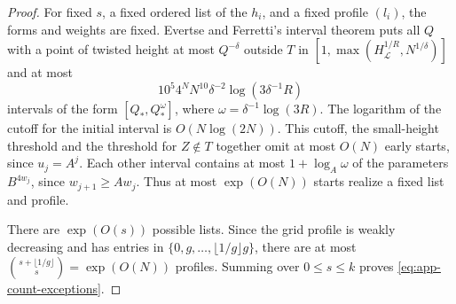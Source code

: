 \documentclass[11pt,reqno,a4paper]{amsart}
\theoremstyle{remark}
\begin{document}
\begin{proof}
For fixed \(s\), a fixed ordered list of the \(h_i\), and a fixed
profile \((l_i)\), the forms and weights are fixed.
Evertse and Ferretti's interval theorem
\cite[Theorem~2.3]{cnt-evertse-ferretti} puts all \(Q\) with a
point of twisted height at most \(Q^{-\delta}\) outside \(T\) in
\([1,\max(H_{\mathcal L}^{1/R},N^{1/\delta})]\) and at most
\[
 10^5 4^N N^{10}\delta^{-2}\log(3\delta^{-1}R)
\]
intervals of the form \([Q_*,Q_*^\omega]\), where
\(\omega=\delta^{-1}\log(3R)\). The logarithm of the cutoff for
the initial interval is \(O(N\log(2N))\). This cutoff, the
small-height threshold and the threshold for \(Z\notin T\) together
omit at most \(O(N)\) early starts, since \(u_j=A^j\).
Each other interval contains at most \(1+\log_A\omega\) of the
parameters \(B^{4w_j}\), since \(w_{j+1}\ge A w_j\). Thus at most
\(\exp(O(N))\) starts realize a fixed list and profile.

There are \(\exp(O(s))\) possible lists. Since the grid profile
is weakly decreasing and has entries in
\(\{0,g,\ldots,\lfloor1/g\rfloor g\}\), there are at most
\(\binom{s+\lfloor1/g\rfloor}{s}=\exp(O(N))\) profiles.
Summing over \(0\le s\le k\) proves \eqref{eq:app-count-exceptions}.
\end{proof}
\end{document}
